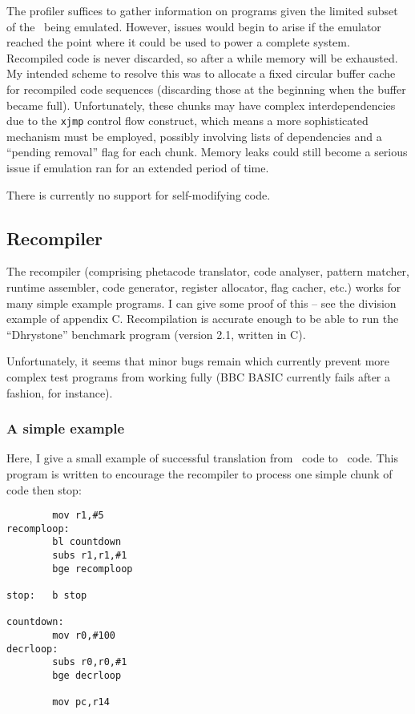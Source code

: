 The profiler suffices to gather information on programs given the limited subset of the \arm\ being emulated. However, issues would begin to arise if the emulator reached the point where it could be used to power a complete system. Recompiled code is never discarded, so after a while memory will be exhausted. My intended scheme to resolve this was to allocate a fixed circular buffer cache for recompiled code sequences (discarding those at the beginning when the buffer became full). Unfortunately, these chunks may have complex interdependencies due to the {\tt xjmp} control flow construct, which means a more sophisticated mechanism must be employed, possibly involving lists of dependencies and a ``pending removal'' flag for each chunk. Memory leaks could still become a serious issue if emulation ran for an extended period of time.

There is currently no support for self-modifying code.

\subsection{Recompiler}

The recompiler (comprising phetacode translator, code analyser, pattern matcher, runtime assembler, code generator, register allocator, flag cacher, etc.) works for many simple example programs. I can give some proof of this -- see the division example of appendix C. Recompilation is accurate enough to be able to run the ``Dhrystone'' benchmark program (version 2.1, written in C).

Unfortunately, it seems that minor bugs remain which currently prevent more complex test programs from working fully (BBC BASIC currently fails after a fashion, for instance).

\subsubsection{A simple example}

Here, I give a small example of successful translation from \arm\ code to \ia\ code. This program is written to encourage the recompiler to process one simple chunk of code then stop:

\begin{verbatim}
        mov r1,#5
recomploop:
        bl countdown
        subs r1,r1,#1
        bge recomploop

stop:   b stop

countdown:
        mov r0,#100
decrloop:
        subs r0,r0,#1
        bge decrloop

        mov pc,r14
\end{verbatim}

